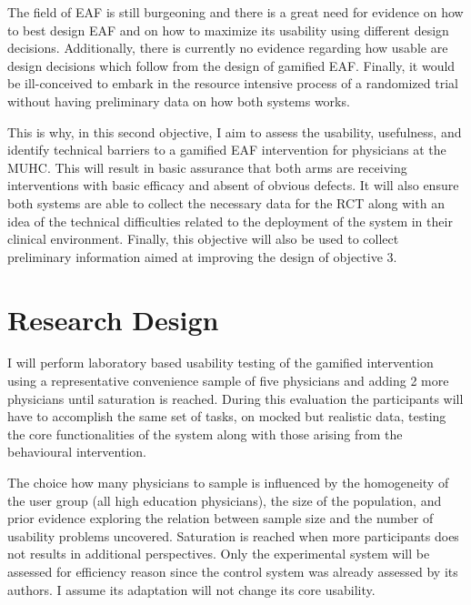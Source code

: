 %
%
The field of \gls{EAF} is still burgeoning and there is a great need for evidence on how to best design \gls{EAF} and on how to maximize its usability using different design decisions.\cite{brown2016interface} Additionally, there is currently no evidence regarding how usable are design decisions which follow from the design of gamified \gls{EAF}. Finally, it would be ill-conceived to embark in the resource intensive process of a randomized trial without having preliminary data on how both systems works.

This is why, in this second objective, I aim to assess the usability, usefulness, and identify technical barriers to a gamified \gls{EAF} intervention for physicians at the \gls{MUHC}. This will result in basic assurance that both arms are receiving interventions with basic efficacy and absent of obvious defects. It will also ensure both systems are able to collect the necessary data for the RCT along with an idea of the technical difficulties related to the deployment of the system in their clinical environment. Finally, this objective will also be used to collect preliminary information aimed at improving the design of objective 3.


\section{Research Design}
I will perform laboratory based usability testing of the gamified intervention using a representative convenience sample of five physicians and adding 2 more physicians until saturation is reached. During this evaluation the participants will have to accomplish the same set of tasks, on mocked but realistic data, testing the core functionalities of the system along with those arising from the behavioural intervention.

The choice how many physicians to sample is influenced by the homogeneity of the user group (all high education physicians), the size of the population, and prior evidence exploring the relation between sample size and the number of usability problems uncovered.\cite{nielsen1993mathematical} Saturation is reached when more participants does not results in additional perspectives. Only the experimental system will be assessed for efficiency reason since the control system was already assessed by its authors.\cite{brown2016interface} I assume its adaptation will not change its core usability.

